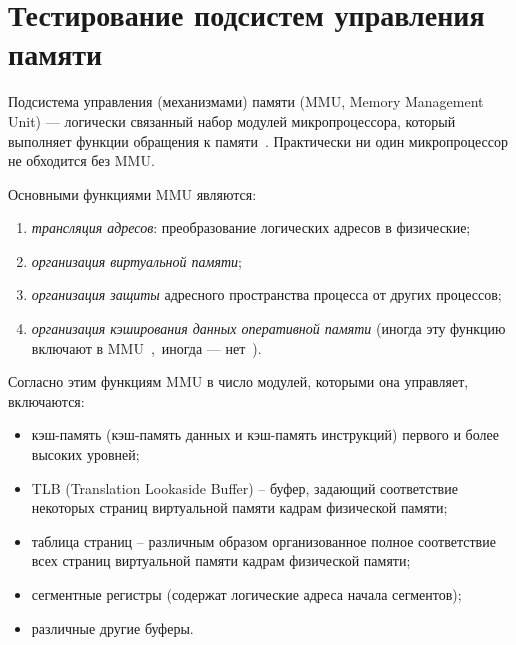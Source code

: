 %
%
%


\section{Тестирование подсистем управления памяти}\label{section:cache}

Подсистема управления (механизмами) памяти (MMU, Memory Management Unit) ---
логически связанный набор модулей микропроцессора, который выполняет
функции обращения к памяти~\cite{MMU}. Практически ни один
микропроцессор не обходится без MMU.

Основными функциями MMU являются:
\begin{enumerate}
  \item \emph{трансляция адресов}: преобразование логических адресов в физические;
  \item \emph{организация виртуальной памяти};
  \item \emph{организация защиты} адресного пространства процесса от других процессов;
  \item \emph{организация кэширования данных оперативной памяти} (иногда эту функцию включают в MMU~\cite{vorobyev},~иногда --- нет~\cite{thompson}).
\end{enumerate}

Согласно этим функциям MMU в число модулей, которыми она управляет, включаются:
\begin{itemize}
  \item кэш-память (кэш-память данных и кэш-память инструкций)  первого и более высоких уровней;
  \item TLB (Translation Lookaside Buffer) -- буфер, задающий
  соответствие некоторых страниц виртуальной памяти кадрам
  физической памяти;
  \item таблица страниц -- различным образом организованное полное соответствие всех страниц виртуальной памяти кадрам физической памяти;
  \item сегментные регистры (содержат логические адреса начала сегментов);
  \item различные другие буферы.
\end{itemize}

